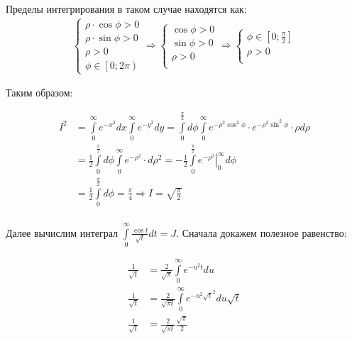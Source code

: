 \documentclass[12pt, a4paper]{article}
\begin{document}
Пределы интегрирования в таком случае находятся как:
\begin{equation*}
\begin{aligned}
\begin{cases}
\rho \cdot \cos{\phi} > 0 \\
 \rho \cdot \sin{\phi} >0 \\
 \rho > 0 \\
  \phi \in \left[0; 2\pi\right)
\end{cases} \Rightarrow
\begin{cases}
 \cos{\phi} > 0 \\
  \sin{\phi} >0 \\
  \rho > 0 \\
\end{cases} \Rightarrow
\begin{cases}
\phi \in \left[0; \frac{\pi}{2}\right]\\
  \rho > 0 \\
  \end{cases}
\end{aligned}
\end{equation*}

Таким образом:

\begin{equation*}
\begin{aligned}
I^2 &= \int\limits_0^{\infty} e^{-x^2}dx \int\limits_0^{\infty} e^{-y^2}dy = \int\limits_0^{\frac{\pi}{2}} d\phi \int\limits_0^{\infty} e^{-\rho^2 \cos^2{\phi}}\cdot e^{-\rho^2 \sin^2{\phi}}  \cdot \rho d\rho \\
&= \frac{1}{2}\int\limits_0^{\frac{\pi}{2}} d\phi \int\limits_0^{\infty} e^{-\rho^2}  \cdot  d\rho^2 = -\frac{1}{2}\int\limits_0^{\frac{\pi}{2}} \left. e^{-\rho^2} \right|_0^{\infty} d\phi\\
& = \frac{1}{2}\int\limits_0^{\frac{\pi}{2}} d\phi = \frac{\pi}{4} \Rightarrow I= \sqrt{\frac{\pi}{2}}\\
\end{aligned}
\end{equation*}

Далее вычислим интеграл $\int\limits_0^{\infty} \frac{\cos{t}}{\sqrt{t}} dt = J$. Сначала докажем полезное равенство:

\begin{equation*}
\begin{aligned}
\frac{1}{\sqrt{t}} &= \frac{2}{\sqrt{\pi}} \int\limits_0^{\infty} e^{-u^2 t}du \\
\frac{1}{\sqrt{t}} &= \frac{2}{\sqrt{\pi t}} \int\limits_0^{\infty} e^{-u^2 \sqrt{t}^2}du\sqrt{t} \\
\frac{1}{\sqrt{t}} &= \frac{2}{\sqrt{\pi t}} \frac{\sqrt{\pi}}{2}
\end{aligned}
\end{equation*}
\end{document}
